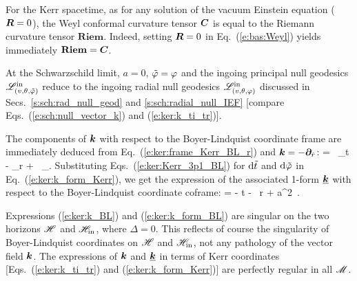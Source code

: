 \begin{remark}
For the Kerr spacetime, as for any solution of the vacuum Einstein equation ($\bm{R}=0$),
the Weyl conformal curvature tensor $\bm{C}$ is equal to the Riemann curvature tensor $\textbf{Riem}$.
Indeed, setting $\bm{R}=0$ in Eq.~(\ref{e:bas:Weyl}) yields
immediately $\textbf{Riem} = \bm{C}$.
\end{remark}

\begin{remark}
At the Schwarzschild limit, $a=0$, ${\tilde\varphi} = \varphi$ and the ingoing principal null geodesics
$\mathscr{L}^{\rm in}_{(v,\theta,{\tilde\varphi})}$ reduce to the ingoing radial null geodesics
$\mathscr{L}^{\rm in}_{(v,\theta,\varphi)}$ discussed in Secs.~\ref{s:sch:rad_null_geod} and \ref{s:sch:radial_null_IEF} [compare Eqs.~(\ref{e:sch:null_vector_k}) and (\ref{e:ker:k_ti_tr})].
\end{remark}


The components of $\bm{k}$ with respect to the Boyer-Lindquist coordinate frame
are immediately deduced from Eq.~(\ref{e:ker:frame_Kerr_BL_r})
and $\bm{k} = - \bm{\partial}_{\hat{r}}$:
\be \label{e:ker:k_BL}
     =  \, \wpar_t
        - \wpar_r +  \, \wpar_\ph .
\ee
Substituting Eqs.~(\ref{e:ker:Kerr_3p1_BL}) for $\mathrm{d}{\tilde t}$ and $\mathrm{d}{\tilde\varphi}$ in
Eq.~(\ref{e:ker:k_form_Kerr}), we get the expression of the associated 1-form
$\underline{\bm{k}}$ with respect to the Boyer-Lindquist coordinate coframe:
\be \label{e:ker:k_form_BL}
     = - \dd t - \, \dd r + a\sin^2\th \, \dd \ph .
\ee
\begin{remark}
Expressions (\ref{e:ker:k_BL}) and (\ref{e:ker:k_form_BL}) are singular
on the two horizons $\mathscr{H}$ and $\mathscr{H}_{\rm in}$, where $\Delta = 0$.
This reflects of course the
singularity of Boyer-Lindquist coordinates on $\mathscr{H}$ and $\mathscr{H}_{\rm in}$, not any
pathology of the vector field $\bm{k}$. The expressions of $\bm{k}$ and
$\underline{\bm{k}}$ in terms of Kerr coordinates [Eqs.~(\ref{e:ker:k_ti_tr})
and (\ref{e:ker:k_form_Kerr})] are perfectly regular in all $\mathscr{M}$.
\end{remark}


